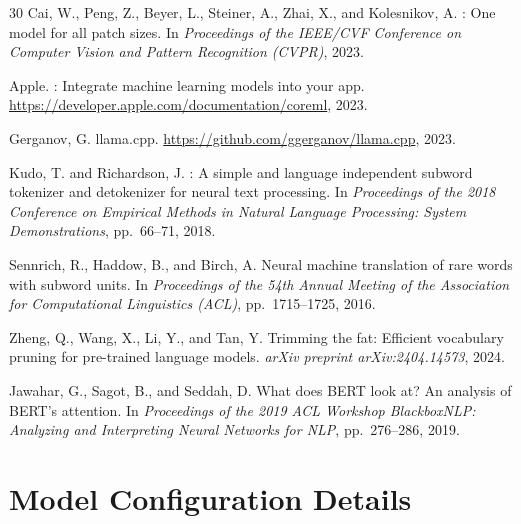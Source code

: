 \documentclass[11pt]{article}
\begin{document}
\begin{thebibliography}{30}
Cai, W., Peng, Z., Beyer, L., Steiner, A., Zhai, X., and Kolesnikov, A.
: One model for all patch sizes.
\newblock In \emph{Proceedings of the IEEE/CVF Conference on Computer Vision and Pattern Recognition (CVPR)}, 2023.

Apple.
: Integrate machine learning models into your app.
\newblock \url{https://developer.apple.com/documentation/coreml}, 2023.

Gerganov, G.
\newblock llama.cpp.
\newblock \url{https://github.com/ggerganov/llama.cpp}, 2023.

Kudo, T. and Richardson, J.
: A simple and language independent subword tokenizer and detokenizer for neural text processing.
\newblock In \emph{Proceedings of the 2018 Conference on Empirical Methods in Natural Language Processing: System Demonstrations}, pp.\ 66--71, 2018.

Sennrich, R., Haddow, B., and Birch, A.
\newblock Neural machine translation of rare words with subword units.
\newblock In \emph{Proceedings of the 54th Annual Meeting of the Association for Computational Linguistics (ACL)}, pp.\ 1715--1725, 2016.

Zheng, Q., Wang, X., Li, Y., and Tan, Y.
\newblock Trimming the fat: Efficient vocabulary pruning for pre-trained language models.
\newblock \emph{arXiv preprint arXiv:2404.14573}, 2024.

Jawahar, G., Sagot, B., and Seddah, D.
\newblock What does {BERT} look at? {A}n analysis of {BERT}'s attention.
\newblock In \emph{Proceedings of the 2019 ACL Workshop BlackboxNLP: Analyzing and Interpreting Neural Networks for NLP}, pp.\ 276--286, 2019.

\end{thebibliography}

\appendix

\section{Model Configuration Details}
\label{app:config}
\end{document}
